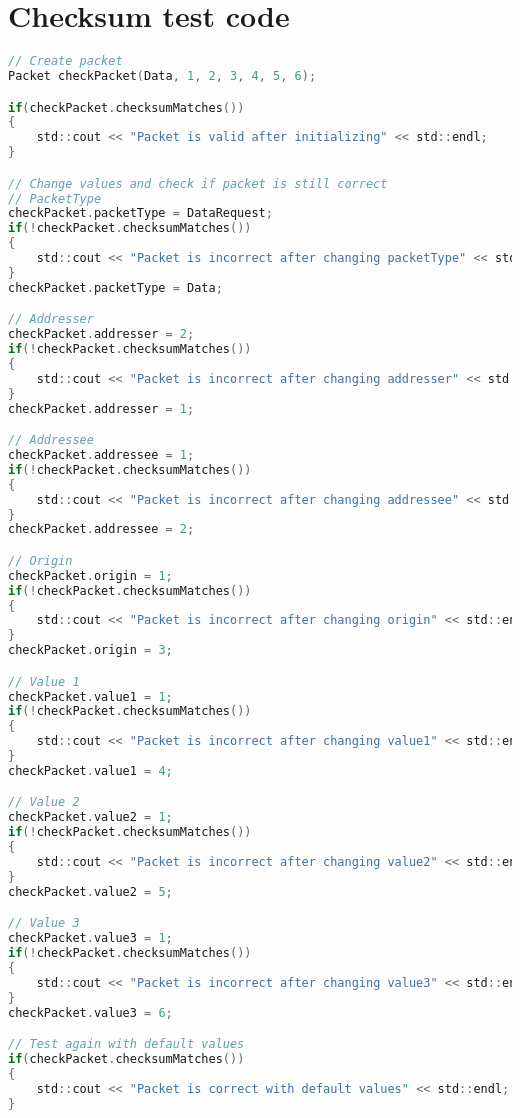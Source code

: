 \chapter{Checksum test code} \label{cha:checksumtest}
\begin{lstlisting}[language=C]
// Create packet
Packet checkPacket(Data, 1, 2, 3, 4, 5, 6);

if(checkPacket.checksumMatches())
{
    std::cout << "Packet is valid after initializing" << std::endl;
}

// Change values and check if packet is still correct
// PacketType
checkPacket.packetType = DataRequest;
if(!checkPacket.checksumMatches())
{
    std::cout << "Packet is incorrect after changing packetType" << std::endl;
}
checkPacket.packetType = Data;

// Addresser
checkPacket.addresser = 2;
if(!checkPacket.checksumMatches())
{
    std::cout << "Packet is incorrect after changing addresser" << std::endl;
}
checkPacket.addresser = 1;

// Addressee
checkPacket.addressee = 1;
if(!checkPacket.checksumMatches())
{
    std::cout << "Packet is incorrect after changing addressee" << std::endl;
}
checkPacket.addressee = 2;

// Origin
checkPacket.origin = 1;
if(!checkPacket.checksumMatches())
{
    std::cout << "Packet is incorrect after changing origin" << std::endl;
}
checkPacket.origin = 3;

// Value 1
checkPacket.value1 = 1;
if(!checkPacket.checksumMatches())
{
    std::cout << "Packet is incorrect after changing value1" << std::endl;
}
checkPacket.value1 = 4;

// Value 2
checkPacket.value2 = 1;
if(!checkPacket.checksumMatches())
{
    std::cout << "Packet is incorrect after changing value2" << std::endl;
}
checkPacket.value2 = 5;

// Value 3
checkPacket.value3 = 1;
if(!checkPacket.checksumMatches())
{
    std::cout << "Packet is incorrect after changing value3" << std::endl;
}
checkPacket.value3 = 6;

// Test again with default values
if(checkPacket.checksumMatches())
{
    std::cout << "Packet is correct with default values" << std::endl;
}
\end{lstlisting}
